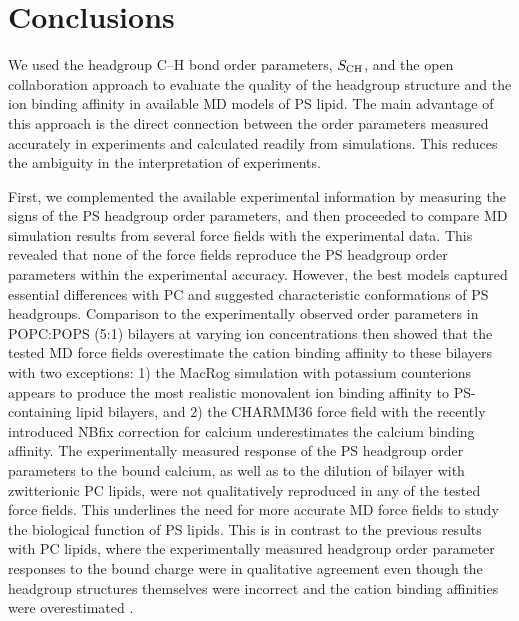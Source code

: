 \documentclass[journal=jpcbfk,manuscript=article]{achemso}
\begin{document}
\section{Conclusions}

We used the headgroup C--H bond order parameters, $S_{\rm CH}$, and the open collaboration approach to evaluate the quality
of the headgroup structure and the ion binding affinity 
in available MD models of PS lipid.
The main advantage of this approach is the direct connection
between the order parameters measured accurately in experiments and calculated readily from simulations. 
This reduces the ambiguity in the interpretation of experiments.

First, we complemented the available experimental information \cite{browning80,roux90} by measuring the signs of the PS headgroup order parameters,
and then proceeded to compare MD simulation results from several force fields with the experimental data.
This revealed that none of the force fields
reproduce the PS headgroup order parameters within the experimental accuracy.
However, the best models captured essential differences with PC and
suggested characteristic conformations of PS headgroups.
Comparison to the experimentally observed order parameters in POPC:POPS (5:1) bilayers  at varying ion
concentrations \cite{roux90} then showed that the tested MD force fields
overestimate the cation binding affinity to these bilayers with two exceptions: 1) the MacRog simulation with potassium counterions appears to produce the most realistic monovalent ion binding
affinity to PS-containing lipid bilayers, and 2) the CHARMM36 force field with the recently introduced
NBfix correction for calcium \cite{kim16} underestimates the calcium binding affinity.
The experimentally measured response of the PS headgroup order parameters to the bound calcium, as well as to the dilution of bilayer with zwitterionic PC lipids, were not
qualitatively reproduced in any of the tested force fields. This underlines the need for more accurate
MD force fields to study the biological function of PS lipids.
This is in contrast to the previous results with PC lipids,
where the experimentally measured headgroup order parameter responses to the bound charge
were in qualitative agreement even though the headgroup structures themselves were
incorrect and the cation binding affinities were overestimated \cite{catte16}.
\end{document}
